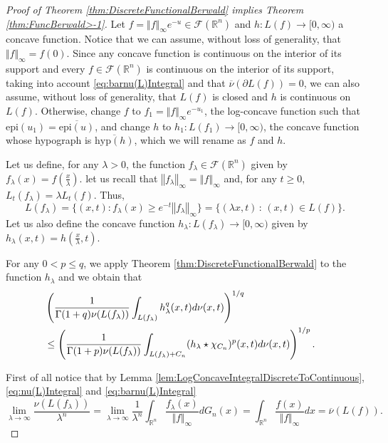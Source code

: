 \documentclass{amsart}
\newcommand{\R}{\mathbb R}
\newcommand{\norma}[1]{\left\Vert#1\right\Vert}
\theoremstyle{remark}
\theoremstyle{definition}
\numberwithin{equation}{section}
\begin{document}
\begin{proof}[Proof of Theorem \ref{thm:DiscreteFunctionalBerwald} implies Theorem \ref{thm:FuncBerwald>-1}]

Let $f=\Vert f\Vert_\infty e^{-u}\in\mathcal{F}(\R^n)$ and $h:L(f)\to[0,\infty)$ a concave function. Notice that we can assume, without loss of generality, that $\Vert f\Vert_\infty=f(0)$. Since any concave function is continuous on the interior of its support and  every $f\in\mathcal{F}(\R^n)$ is continuous on the interior of its support, taking into account \eqref{eq:barnu(L)Integral} and that $\overline{\nu}(\partial L(f))=0$, we can also assume, without loss of generality, that $L(f)$ is closed and $h$ is continuous on $L(f)$. Otherwise, change $f$ to $f_1=\Vert f\Vert_\infty e^{-u_1}$, the log-concave function such that $\textrm{epi}(u_1)=\overline{\textrm{epi}(u)}$, and change $h$ to $h_1:L(f_1) \to [0,\infty)$, the concave function whose hypograph is $\overline{\textrm{hyp}(h)}$, which we will rename as $f$ and $h$.

Let us define, for any $\lambda>0$, the function $f_\lambda\in\mathcal{F}(\R^n)$ given by $f_\lambda(x)=f\left( \frac{x}{\lambda} \right)$. let us recall that $\norma{f_\lambda}_{\infty}=\norma{f}_{\infty}$ and, for any $t \geq 0$, $L_t(f_\lambda)=\lambda L_t(f)$.
Thus,
$$
L(f_\lambda)=\{ (x,t) : f_\lambda(x) \geq e^{-t} \norma{f_\lambda}_{\infty} \} =\{(\lambda x,t)\,:\,(x,t)\in L(f)\}.
$$
Let us also define the concave function $h_\lambda \colon L(f_\lambda) \to [0, \infty)$ given by $h_\lambda(x,t)=h\left(\frac{x}{\lambda}, t \right)$.

For any $0<p\leq q$, we apply Theorem \ref{thm:DiscreteFunctionalBerwald} to the function $h_\lambda$ and we obtain that
\begin{align*}
&\left( \frac{1}{\Gamma(1+q) \nu(L(f_\lambda))}  \int_{L(f_\lambda)} h_\lambda^q(x,t) d\nu(x,t) \right)^{1/q}  \cr
&\leq\left( \frac{1}{\Gamma(1+p) \nu(L(f_\lambda))}  \int_{L(f_\lambda)+C_n} (h_\lambda\star\chi_{C_n})^p(x,t) d\nu(x,t) \right)^{1/p}.
\end{align*}

First of all notice that by Lemma \ref{lem:LogConcaveIntegralDiscreteToContinuous}, \eqref{eq:nu(L)Integral} and \eqref{eq:barnu(L)Integral}
\begin{equation}\label{set_L_r}
\lim_{\lambda \to \infty} \frac{\nu(L(f_\lambda))}{\lambda^n} =\lim_{\lambda \to \infty}\frac{1}{\lambda^n}\int_{\R^n}\frac{f_\lambda(x)}{\Vert f\Vert_\infty}dG_n(x) = \int_{\R^n}\frac{f(x)}{\Vert f\Vert_\infty}dx=\overline{\nu}(L(f)).
\end{equation}



\end{proof}
\end{document}
